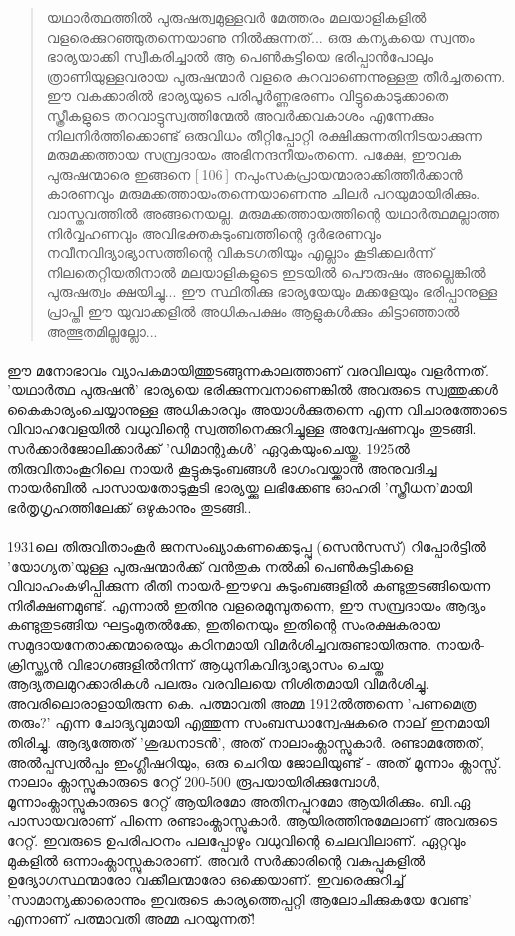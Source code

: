 \begin{quotation}
യഥാർത്ഥത്തിൽ പുരുഷത്വമുള്ളവർ മേത്തരം മലയാളികളിൽ വളരെക്കുറഞ്ഞുതന്നെയാണു നിൽക്കുന്നത്... ഒരു കന്യകയെ സ്വന്തം ഭാര്യയാക്കി സ്വീകരിച്ചാൽ ആ പെൺകുട്ടിയെ ഭരിപ്പാൻപോലും ത്രാണിയുള്ളവരായ പുരുഷന്മാർ വളരെ കുറവാണെന്നുള്ളതു തീർച്ചതന്നെ. ഈ വകക്കാരിൽ ഭാര്യയുടെ പരിപൂർണ്ണഭരണം വിട്ടുകൊടുക്കാതെ സ്ത്രീകളുടെ തറവാട്ടുസ്വത്തിന്മേൽ അവർക്കവകാശം എന്നേക്കും നിലനിർത്തിക്കൊണ്ട് ഒരുവിധം തീറ്റിപ്പോറ്റി രക്ഷിക്കുന്നതിനിടയാക്കുന്ന മരുമക്കത്തായ സമ്പ്രദായം അഭിനന്ദനീയംതന്നെ. പക്ഷേ, ഈവക പുരുഷന്മാരെ ഇങ്ങനെ [ 106 ] നപുംസകപ്രായന്മാരാക്കിത്തീർക്കാൻ കാരണവും മരുമക്കത്തായംതന്നെയാണെന്നു ചിലർ പറയുമായിരിക്കും. വാസ്തവത്തിൽ അങ്ങനെയല്ല. മരുമക്കത്തായത്തിന്റെ യഥാർത്ഥമല്ലാത്ത നിർവ്വഹണവും അവിഭക്തകുടുംബത്തിന്റെ ദുർഭരണവും നവീനവിദ്യാഭ്യാസത്തിന്റെ വികടഗതിയും എല്ലാം കൂടിക്കലർന്ന് നിലതെറ്റിയതിനാൽ മലയാളികളുടെ ഇടയിൽ പൌരുഷം അല്ലെങ്കിൽ പുരുഷത്വം ക്ഷയിച്ചു... ഈ സ്ഥിതിക്കു ഭാര്യയേയും മക്കളേയും ഭരിപ്പാനുള്ള പ്രാപ്തി ഈ യുവാക്കളിൽ അധികപക്ഷം ആളുകൾക്കും കിട്ടാഞ്ഞാൽ അത്ഭുതമില്ലല്ലോ...
\end{quotation}


\paragraph{}ഈ മനോഭാവം വ്യാപകമായിത്തുടങ്ങുന്നകാലത്താണ് വരവിലയും വളർന്നത്. 'യഥാർത്ഥ പുരുഷൻ' ഭാര്യയെ ഭരിക്കുന്നവനാണെങ്കിൽ അവരുടെ സ്വത്തുക്കൾ കൈകാര്യംചെയ്യാനുള്ള അധികാരവും അയാൾക്കുതന്നെ എന്ന വിചാരത്തോടെ വിവാഹവേളയിൽ വധുവിന്റെ സ്വത്തിനെക്കുറിച്ചുള്ള അന്വേഷണവും തുടങ്ങി. സർക്കാർജോലിക്കാർക്ക് 'ഡിമാന്റുകൾ' ഏറുകയുംചെയ്തു. 1925ൽ തിരുവിതാംകൂറിലെ നായർ കൂട്ടുകുടുംബങ്ങൾ ഭാഗംവയ്ക്കാൻ അനുവദിച്ച നായർബിൽ പാസായതോടുകൂടി ഭാര്യയ്ക്കു ലഭിക്കേണ്ട ഓഹരി 'സ്ത്രീധന'മായി ഭർതൃഗൃഹത്തിലേക്ക് ഒഴുകാനും തുടങ്ങി..

\paragraph{} 1931ലെ തിരുവിതാംകൂർ ജനസംഖ്യാകണക്കെടുപ്പു (സെൻസസ്) റിപ്പോർട്ടിൽ 'യോഗ്യത'യുള്ള പുരുഷന്മാർക്ക് വൻതുക നൽകി പെൺകുട്ടികളെ വിവാഹംകഴിപ്പിക്കുന്ന രീതി നായർ-ഈഴവ കുടുംബങ്ങളിൽ കണ്ടുതുടങ്ങിയെന്ന നിരീക്ഷണമുണ്ട്. എന്നാൽ ഇതിനു വളരെമുമ്പുതന്നെ, ഈ സമ്പ്രദായം ആദ്യം കണ്ടുതുടങ്ങിയ ഘട്ടംമുതൽക്കേ, ഇതിനെയും ഇതിന്റെ സംരക്ഷകരായ സമുദായനേതാക്കന്മാരെയും കഠിനമായി വിമർശിച്ചവരുണ്ടായിരുന്നു. നായർ-ക്രിസ്ത്യൻ വിഭാഗങ്ങളിൽനിന്ന് ആധുനികവിദ്യാഭ്യാസം ചെയ്ത ആദ്യതലമുറക്കാരികൾ പലരും വരവിലയെ നിശിതമായി വിമർശിച്ചു. അവരിലൊരാളായിരുന്ന കെ. പത്മാവതി അമ്മ 1912ൽത്തന്നെ 'പണമെത്ര തരും?' എന്ന ചോദ്യവുമായി എത്തുന്ന സംബന്ധാന്വേഷകരെ നാല് ഇനമായി തിരിച്ചു. ആദ്യത്തേത് 'ശുദ്ധനാടൻ', അത് നാലാംക്ലാസ്സുകാർ. രണ്ടാമത്തേത്, അൽപ്പസ്വൽപ്പം ഇംഗ്ലീഷറിയും, ഒരു ചെറിയ ജോലിയുണ്ട് - അത് മൂന്നാം ക്ലാസ്സ്. നാലാം ക്ലാസ്സുകാരുടെ റേറ്റ് 200-500 രൂപയായിരിക്കുമ്പോൾ, മൂന്നാംക്ലാസ്സുകാരുടെ റേറ്റ് ആയിരമോ അതിനപ്പുറമോ ആയിരിക്കും. ബി.ഏ പാസായവരാണ് പിന്നെ രണ്ടാംക്ലാസ്സുകാർ. ആയിരത്തിനുമേലാണ് അവരുടെ റേറ്റ്. ഇവരുടെ ഉപരിപഠനം പലപ്പോഴും വധുവിന്റെ ചെലവിലാണ്. ഏറ്റവും മുകളിൽ ഒന്നാംക്ലാസ്സുകാരാണ്. അവർ സർക്കാരിന്റെ വകുപ്പുകളിൽ ഉദ്യോഗസ്ഥന്മാരോ വക്കീലന്മാരോ ഒക്കെയാണ്. ഇവരെക്കുറിച്ച് 'സാമാന്യക്കാരൊന്നും ഇവരുടെ കാര്യത്തെപ്പറ്റി ആലോചിക്കുകയേ വേണ്ട' എന്നാണ് പത്മാവതി അമ്മ പറയുന്നത്!


